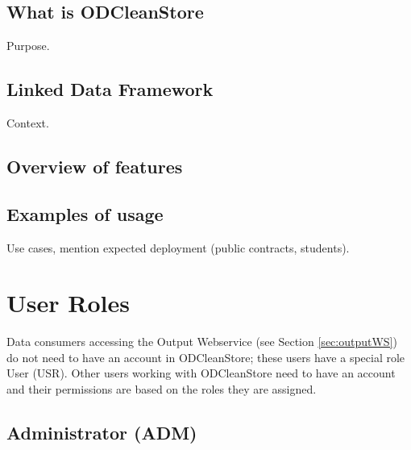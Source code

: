 
\newcommand{\version}{0.1}
\newcommand{\documentname}{User Manual}





\renewcommand{\contentsname}{Contents}
\tableofcontents
\bigskip

\newpage



\section{What is ODCleanStore}

Purpose.

\section{Linked Data Framework}

Context.

\section{Overview of features}

\section{Examples of usage}

Use cases, mention expected deployment (public contracts, students).


\chapter{User Roles}

Data consumers accessing the Output Webservice (see Section \ref{sec:outputWS}) do not need to have an account in ODCleanStore; these users have a special role User (USR). Other users working with ODCleanStore need to have an account and their permissions are based on the roles they are assigned.

\section[Administrator]{Administrator (ADM)}


